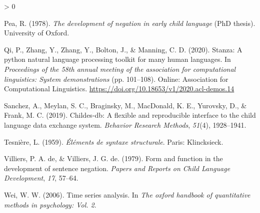 \documentclass[
  english,
  man,floatsintext]{apa6}
\newlength{\cslhangindent}
\newenvironment{CSLReferences}[2] %
 {%
  \setlength{\parindent}{0pt}
  \ifodd #1 \everypar{\setlength{\hangindent}{\cslhangindent}}\ignorespaces\fi
  \ifnum #2 > 0
  \setlength{\parskip}{#2\baselineskip}
  \fi
 }%
 {}
\begin{document}
\begin{CSLReferences}{1}{0}
\leavevmode\hypertarget{ref-pea1978}{}%
Pea, R. (1978). \emph{The development of negation in early child language} (PhD thesis). University of Oxford.

\leavevmode\hypertarget{ref-qi-etal-2020-stanza}{}%
Qi, P., Zhang, Y., Zhang, Y., Bolton, J., \& Manning, C. D. (2020). {S}tanza: A python natural language processing toolkit for many human languages. In \emph{Proceedings of the 58th annual meeting of the association for computational linguistics: System demonstrations} (pp. 101--108). Online: Association for Computational Linguistics. \url{https://doi.org/10.18653/v1/2020.acl-demos.14}

\leavevmode\hypertarget{ref-sanchez2019childes}{}%
Sanchez, A., Meylan, S. C., Braginsky, M., MacDonald, K. E., Yurovsky, D., \& Frank, M. C. (2019). Childes-db: A flexible and reproducible interface to the child language data exchange system. \emph{Behavior Research Methods}, \emph{51}(4), 1928--1941.

\leavevmode\hypertarget{ref-dg}{}%
Tesnière, L. (1959). \emph{{É}l{é}ments de syntaxe structurale}. Paris: Klincksieck.

\leavevmode\hypertarget{ref-de1979form}{}%
Villiers, P. A. de, \& Villiers, J. G. de. (1979). Form and function in the development of sentence negation. \emph{Papers and Reports on Child Language Development}, \emph{17}, 57--64.

\leavevmode\hypertarget{ref-wei2006time}{}%
Wei, W. W. (2006). Time series analysis. In \emph{The oxford handbook of quantitative methods in psychology: Vol. 2}.

\end{CSLReferences}
\end{document}
